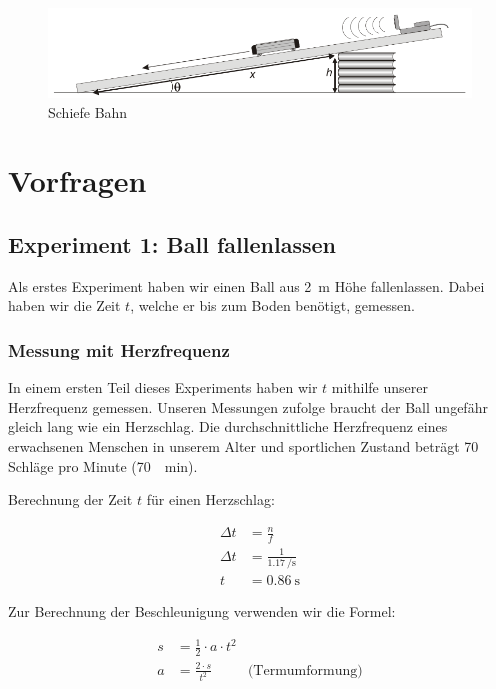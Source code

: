\documentclass[a4paper, titlepage]{article}
\begin{document}
    \begin{figure}
        \includegraphics[width=\textwidth]{images/incline.png}
        \caption{Schiefe Bahn}
        \label{incline}
    \end{figure}

    \section{Vorfragen}
    \subsection{Experiment 1: Ball fallenlassen}
    Als erstes Experiment haben wir einen Ball aus \SI{2}{\metre} Höhe
    fallenlassen. Dabei haben wir die Zeit $t$, welche er bis zum Boden
    benötigt, gemessen.
    \subsubsection{Messung mit Herzfrequenz}
    In einem ersten Teil dieses Experiments haben wir $t$
    mithilfe unserer Herzfrequenz gemessen.
    Unseren Messungen zufolge
    braucht der Ball ungefähr gleich lang wie ein Herzschlag. Die
    durchschnittliche Herzfrequenz eines erwachsenen Menschen in unserem
    Alter und sportlichen Zustand beträgt 70 Schläge pro Minute (\SI{70}{\per\minute}).

    Berechnung der Zeit $t$ für einen Herzschlag:
    
    \begin{align}
        \Delta t &= \frac{n}{f} \label{tnf} \\
        \Delta t &= \frac{1}{\SI{1.17}{\per\second}} \\
        t &= \SI{0.86}{\second}
    \end{align}

    Zur Berechnung der Beschleunigung verwenden wir
    die Formel:

    \begin{align}
        s &= \frac{1}{2} \cdot a \cdot t^2 \\
        a &= \frac{2 \cdot s}{t^2} & \text{(Termumformung)} \label{ast}
    \end{align}
\end{document}
